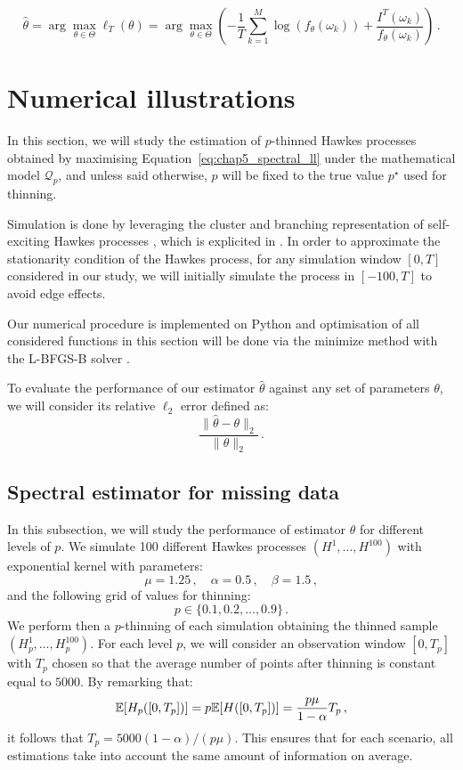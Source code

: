     \[
        \hat \theta = \arg\max_{\theta \in \Theta} \ell_T (\theta)
        = \arg\max_{\theta \in \Theta}  \left(-\frac{1}{T}\sum_{k=1}^{M}{\log(f_\theta (\omega_k)) + \frac{I^T(\omega_k)}{f_\theta(\omega_k)}}\right)\,.
    \]

\section{Numerical illustrations}
    In this section, we will study the estimation of $p$-thinned Hawkes processes obtained by maximising Equation~\eqref{eq:chap5_spectral_ll} under the mathematical model $\mathcal{Q}_p$,
    and unless said otherwise, $p$ will be fixed to the true value $p^\star$ used for thinning.

    Simulation is done by leveraging the cluster and branching representation of self-exciting Hawkes processes \parencite{Hawkes1974},
    which is explicited in \textcite[Algorithm 2]{Moller2005}.
    In order to approximate the stationarity condition of the Hawkes process,
    for any simulation window $[0,T]$ considered in our study, 
    we will initially simulate the process in $[-100, T]$ to avoid edge effects.

    Our numerical procedure is implemented on \textrm{Python} and optimisation of all considered functions in this section will be done via the \textrm{minimize} method with the L-BFGS-B solver \parencite{Byrd1995}.

    To evaluate the performance of our estimator $\hat\theta$ against any set of parameters $\theta$,
    we will consider its relative $\ell_2$ error defined as:
    \[\frac{\|\hat \theta - \theta\|_2}{\|\theta\|_2}\,.\]

    \subsection{Spectral estimator for missing data}\label{sec:chap5_missing_numerical}

    In this subsection, we will study the performance of estimator $\hat\theta$ for different levels of $p$.
    We simulate 100 different Hawkes processes $(H^1,\ldots, H^{100})$ with exponential kernel with parameters:
    \[\mu = 1.25\,,\quad \alpha = 0.5\,,\quad \beta = 1.5\,,\]
    and the following grid of values for thinning:
    \[p\in\{0.1, 0.2, \ldots, 0.9\}\,.\]
    We perform then a $p$-thinning of each simulation obtaining the thinned sample $(H_p^1, \ldots, H_p^{100})$.
    For each level $p$, 
    we will consider an observation window $[0,T_p]$ with $T_p$ chosen so that the average number of points after thinning is constant equal to $5000$.
    By remarking that:
    \[{\mathbb E}[H_p([0, T_p])] = p{\mathbb E}[H([0,T_p])] = \frac{ p \mu }{1-\alpha} T_p\,,\]
    it follows that $T_p = 5000 (1-\alpha) / (p \mu)$.
    This ensures that for each scenario, all estimations take into account the same amount of information on average.


